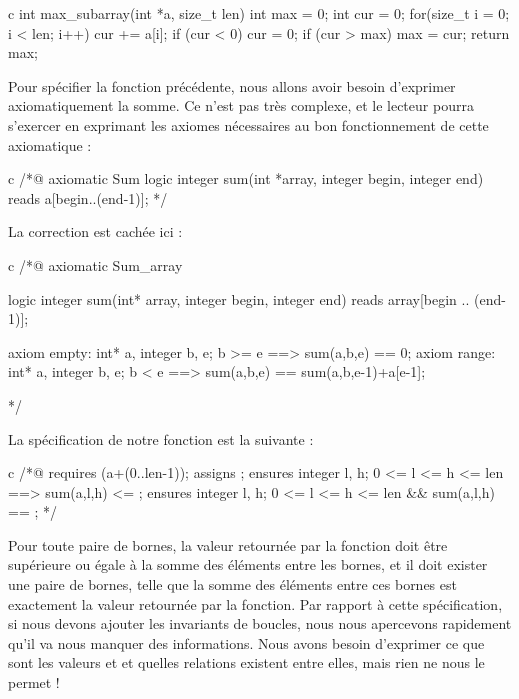 \documentclass[middle]{zmdocument}
\begin{document}
\begin{CodeBlock}{c}
int max_subarray(int *a, size_t len) {
  int max = 0;
  int cur = 0;
  for(size_t i = 0; i < len; i++) {
    cur += a[i];
    if (cur < 0)   cur = 0;
    if (cur > max) max = cur;
  }
  return max;
}
\end{CodeBlock}



Pour spécifier la fonction précédente, nous allons avoir besoin d'exprimer 
axiomatiquement la somme. Ce n'est pas très complexe, et le lecteur pourra
s'exercer en exprimant les axiomes nécessaires au bon fonctionnement de cette 
axiomatique :



\begin{CodeBlock}{c}
/*@ axiomatic Sum {
  logic integer sum(int *array, integer begin, integer end) reads a[begin..(end-1)];
}*/
\end{CodeBlock}



La correction est cachée ici :



\begin{Spoiler}
\begin{CodeBlock}{c}
/*@
  axiomatic Sum_array{
    logic integer sum(int* array, integer begin, integer end) reads array[begin .. (end-1)];
   
    axiom empty: 
      \forall int* a, integer b, e; b >= e ==> sum(a,b,e) == 0;
    axiom range:
      \forall int* a, integer b, e; b < e ==> sum(a,b,e) == sum(a,b,e-1)+a[e-1];
  }
*/
\end{CodeBlock}
\end{Spoiler}


La spécification de notre fonction est la suivante :



\begin{CodeBlock}{c}
/*@ 
  requires \valid(a+(0..len-1));
  assigns \nothing;
  ensures \forall integer l, h;  0 <= l <= h <= len ==> sum(a,l,h) <= \result;
  ensures \exists integer l, h;  0 <= l <= h <= len &&  sum(a,l,h) == \result;
*/
\end{CodeBlock}



Pour toute paire de bornes, la valeur retournée par la fonction doit être 
supérieure ou égale à la somme des éléments entre les bornes, et il doit exister 
une paire de bornes, telle que la somme des éléments entre ces bornes est 
exactement la valeur retournée par la fonction. Par rapport à cette spécification,
si nous devons ajouter les invariants de boucles, nous nous apercevons rapidement 
qu'il va nous manquer des informations. Nous avons besoin d'exprimer ce que sont
les valeurs  et  et quelles relations existent entre elles,
mais rien ne nous le permet !
\end{document}
